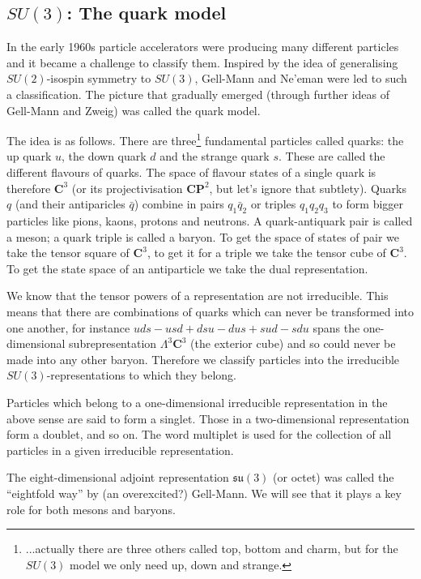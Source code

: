 \documentclass[12pt]{article}
\newcommand{\CC}{\mathbf{C}}
\newcommand{\PP}{\mathbf{P}}
\theoremstyle{definition}
\theoremstyle{check}
\theoremstyle{remark}
\theoremstyle{TheoremNum}
\begin{document}
\subsection{\texorpdfstring{$SU(3)$}{SU(3)}: The quark model}

In the early 1960s particle accelerators were producing many different particles and it became a challenge to classify them. Inspired by the idea of generalising $SU(2)$-isospin symmetry to $SU(3)$, Gell-Mann and Ne'eman were led to such a classification. The picture that gradually emerged (through further ideas of Gell-Mann and Zweig) was called the quark model.

The idea is as follows. There are three\footnote{...actually there are three others called top, bottom and charm, but for the $SU(3)$ model we only need up, down and strange.} fundamental particles called quarks: the up quark $u$, the down quark $d$ and the strange quark $s$. These are called the different flavours of quarks. The space of flavour states of a single quark is therefore $\CC^3$ (or its projectivisation $\CC\PP^2$, but let's ignore that subtlety). Quarks $q$ (and their antiparicles $\bar{q}$) combine in pairs $q_1\bar{q}_2$ or triples $q_1q_2q_3$ to form bigger particles like pions, kaons, protons and neutrons. A quark-antiquark pair is called a meson; a quark triple is called a baryon. To get the space of states of pair we take the tensor square of $\CC^3$, to get it for a triple we take the tensor cube of $\CC^3$. To get the state space of an antiparticle we take the dual representation.

We know that the tensor powers of a representation are not irreducible. This means that there are combinations of quarks which can never be transformed into one another, for instance $uds-usd+dsu-dus+sud-sdu$ spans the one-dimensional subrepresentation $\Lambda^3\CC^3$ (the exterior cube) and so could never be made into any other baryon. Therefore we classify particles into the irreducible $SU(3)$-representations to which they belong.

Particles which belong to a one-dimensional irreducible representation in the above sense are said to form a singlet. Those in a two-dimensional representation form a doublet, and so on. The word multiplet is used for the collection of all particles in a given irreducible representation.

The eight-dimensional adjoint representation $\mathfrak{su}(3)$ (or octet) was called the ``eightfold way'' by (an overexcited?) Gell-Mann. We will see that it plays a key role for both mesons and baryons.
\end{document}
